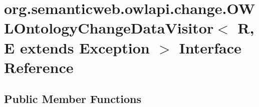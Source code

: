 \hypertarget{interfaceorg_1_1semanticweb_1_1owlapi_1_1change_1_1_o_w_l_ontology_change_data_visitor_3_01_r_00c34458b96d5c21378bf54ce9e4f41fc8}{\section{org.\-semanticweb.\-owlapi.\-change.\-O\-W\-L\-Ontology\-Change\-Data\-Visitor$<$ R, E extends Exception $>$ Interface Reference}
\label{interfaceorg_1_1semanticweb_1_1owlapi_1_1change_1_1_o_w_l_ontology_change_data_visitor_3_01_r_00c34458b96d5c21378bf54ce9e4f41fc8}
}
\subsection*{Public Member Functions}
